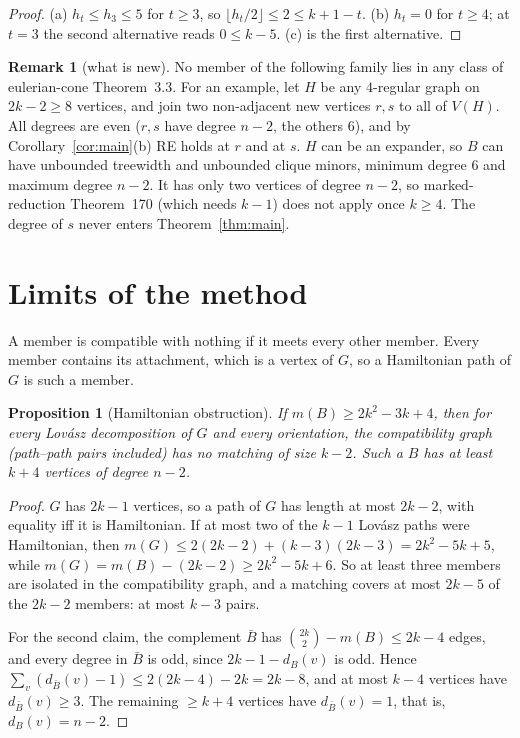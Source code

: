 \documentclass[11pt]{amsart}
\newtheorem{proposition}[theorem]{Proposition}
\theoremstyle{definition}
\newtheorem{remark}[theorem]{Remark}
\begin{document}
\begin{proof}
(a) $h_t\le h_3\le5$ for $t\ge3$, so $\lfloor h_t/2\rfloor\le2\le k+1-t$. (b) $h_t=0$ for $t\ge4$; at
$t=3$ the second alternative reads $0\le k-5$. (c) is the first alternative.
\end{proof}

\begin{remark}[what is new]
No member of the following family lies in any class of eulerian-cone Theorem~3.3. For an
example, let $H$ be any $4$-regular graph on $2k-2\ge 8$ vertices, and join two non-adjacent new
vertices $r,s$ to all of $V(H)$. All degrees are even ($r,s$ have degree $n-2$, the others $6$), and
by Corollary~\ref{cor:main}(b) RE holds at $r$ and at $s$. $H$ can be an expander, so $B$ can have
unbounded treewidth and unbounded clique minors, minimum degree $6$ and maximum degree $n-2$. It
has only two vertices of degree $n-2$, so marked-reduction Theorem~170 (which needs $k-1$) does not
apply once $k\ge4$. The degree of $s$ never enters Theorem~\ref{thm:main}.
\end{remark}

\section{Limits of the method}\label{sec:limits}

A member is compatible with nothing if it meets every other member. Every member contains its
attachment, which is a vertex of $G$, so a Hamiltonian path of $G$ is such a member.

\begin{proposition}[Hamiltonian obstruction]\label{prop:ham}
If $m(B)\ge 2k^2-3k+4$, then for every Lov\'asz decomposition of $G$ and every orientation, the
compatibility graph (path--path pairs included) has no matching of size $k-2$. Such a $B$ has at
least $k+4$ vertices of degree $n-2$.
\end{proposition}

\begin{proof}
$G$ has $2k-1$ vertices, so a path of $G$ has length at most $2k-2$, with equality iff it is
Hamiltonian. If at most two of the $k-1$ Lov\'asz paths were Hamiltonian, then $m(G)\le
2(2k-2)+(k-3)(2k-3)=2k^2-5k+5$, while $m(G)=m(B)-(2k-2)\ge 2k^2-5k+6$. So at least three members are
isolated in the compatibility graph, and a matching covers at most $2k-5$ of the $2k-2$ members: at
most $k-3$ pairs.

For the second claim, the complement $\bar B$ has $\binom{2k}{2}-m(B)\le 2k-4$ edges, and every
degree in $\bar B$ is odd, since $2k-1-d_B(v)$ is odd. Hence $\sum_v(d_{\bar B}(v)-1)\le 2(2k-4)-2k=2k-8$,
and at most $k-4$ vertices have $d_{\bar B}(v)\ge3$. The remaining $\ge k+4$ vertices have
$d_{\bar B}(v)=1$, that is, $d_B(v)=n-2$.
\end{proof}
\end{document}
